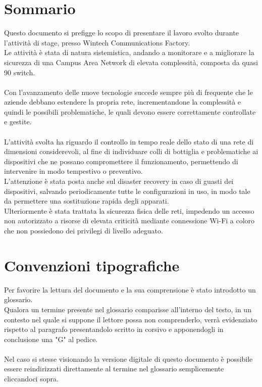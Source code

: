 \documentclass[Tesi.tex]{subfiles}
\begin{document}
\clearpage\thispagestyle{empty}
	
\renewcommand{\chaptername}{}
\renewcommand{\thechapter}{}
\chapter{Sommario}
Questo documento si prefigge lo scopo di presentare il lavoro svolto durante l'attività di stage, presso Wintech Communications Factory. \\
Le attività è stata di natura sistemistica, andando a monitorare e a migliorare la sicurezza di una Campus Area Network di elevata complessità, composta da quasi 90 switch. \\\\

Con l'avanzamento delle nuove tecnologie succede sempre più di frequente che le aziende debbano estendere la propria rete, incrementandone la complessità e quindi le possibili problematiche, le quali devono essere correttamente controllate e gestite. \\\\
L'attività svolta ha riguardo il controllo in tempo reale dello stato di una rete di dimensioni considerevoli, al fine di individuare colli di bottiglia e problematiche ai dispositivi che ne possano compromettere il funzionamento, permettendo di intervenire in modo tempestivo o preventivo.\\
L'attenzione è stata posta anche sul disaster recovery in caso di guasti dei dispositivi, salvando periodicamente tutte le configurazioni in uso, in modo tale da permettere una sostituzione rapida degli apparati. \\
Ulteriormente è stata trattata la sicurezza fisica delle reti, impedendo un accesso non autorizzato a risorse di elevata criticità mediante connessione Wi-Fi a coloro che non possiedono dei privilegi di livello adeguato. \\


\newpage
\chapter{Convenzioni tipografiche}
Per favorire la lettura del documento e la sua comprensione è stato introdotto un glossario. \\
Qualora un termine presente nel glossario comparisse all'interno del testo, in un contesto nel quale si suppone il lettore possa non comprenderlo, verrà evidenziato rispetto al paragrafo presentandolo scritto in corsivo e apponendogli in conclusione una "G" al pedice. \\\\
Nel caso si stesse visionando la versione digitale di questo documento è possibile essere reindirizzati direttamente al termine nel glossario semplicemente cliccandoci sopra. \\


\clearpage
\end{document}
